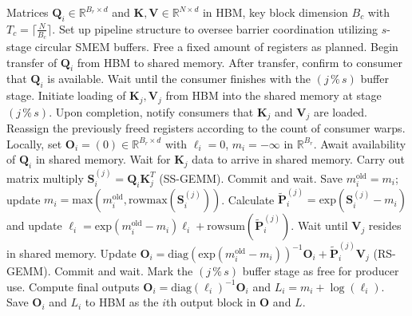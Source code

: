 \begin{enumerate}
\begin{algorithm}[H]
    \caption{\small\label{alg:flash3_wgmma_ws_only}\textsc{FlashAttention-3} forward pass \textbf{excluding} intra-consumer overlap -- CTA perspective}
    \begin{algorithmic}[1]
\REQUIRE Matrices $\mathbf{Q}_i \in \mathbb{R}^{B_r \times d}$ and $\mathbf{K}, \mathbf{V} \in \mathbb{R}^{N \times d}$ in HBM, key block dimension $B_c$ with $T_c = \lceil \frac{N}{B_c} \rceil$.
\STATE Set up pipeline structure to oversee barrier coordination utilizing $s$-stage circular SMEM buffers.
\STATE Free a fixed amount of registers as planned.
\STATE Begin transfer of $\mathbf{Q}_i$ from HBM to shared memory.
\STATE After transfer, confirm to consumer that $\mathbf{Q}_i$ is available.
    \STATE Wait until the consumer finishes with the $(j\,\%\,s)$ buffer stage.
    \STATE Initiate loading of $\mathbf{K}_j, \mathbf{V}_j$ from HBM into the shared memory at stage $(j\,\%\,s)$.
    \STATE Upon completion, notify consumers that $\mathbf{K}_j$ and $\mathbf{V}_j$ are loaded.
\ENDFOR
\ELSE \STATE Reassign the previously freed registers according to the count of consumer warps.
\STATE Locally, set $\mathbf{O}_i = (0) \in \mathbb{R}^{B_r \times d}$ with $\ell_i = 0$, $m_i = -\infty$ in $\mathbb{R}^{B_r}$.
\STATE Await availability of $\mathbf{Q}_i$ in shared memory.
\STATE Wait for $\mathbf{K}_j$ data to arrive in shared memory.
\STATE Carry out matrix multiply $\mathbf{S}_i^{(j)} = \mathbf{Q}_i \mathbf{K}_j^T$ (SS-GEMM). Commit and wait. \label{alg:ws_only_gemm1}
\STATE Save $m_i^{\mathrm{old}} = m_i$; update $m_i = \mathrm{max}(m_i^{\mathrm{old}}, \mathrm{rowmax}(\mathbf{S}_i^{(j)}))$. \label{code-ws:softmax_start}
\STATE Calculate $\widetilde{\mathbf{P}}_i^{(j)} = \mathrm{exp}(\mathbf{S}_i^{(j)} - m_i)$ and update $\ell_i = \mathrm{exp}(m_i^{\mathrm{old}} - m_i) \ell_i + \mathrm{rowsum}(\widetilde{\mathbf{P}}_i^{(j)})$. \label{code-ws:softmax_end}
\STATE Wait until $\mathbf{V}_j$ resides in shared memory.
\STATE Update $\mathbf{O}_i = \mathrm{diag}(\mathrm{exp}(m_i^{\mathrm{old}} - m_i))^{-1} \mathbf{O}_i + \widetilde{\mathbf{P}}_i^{(j)} \mathbf{V}_j$ (RS-GEMM). Commit and wait. \label{alg:ws_only_gemm2}
\STATE Mark the $(j\,\%\,s)$ buffer stage as free for producer use.
\ENDFOR
\STATE Compute final outputs $\mathbf{O}_i = \mathrm{diag}(\ell_i)^{-1} \mathbf{O}_i$ and $L_i = m_i + \log(\ell_i)$.
\STATE Save $\mathbf{O}_i$ and $L_i$ to HBM as the $i$th output block in $\mathbf{O}$ and $L$.
\ENDIF
\end{algorithmic}
\end{algorithm}


\end{enumerate}
